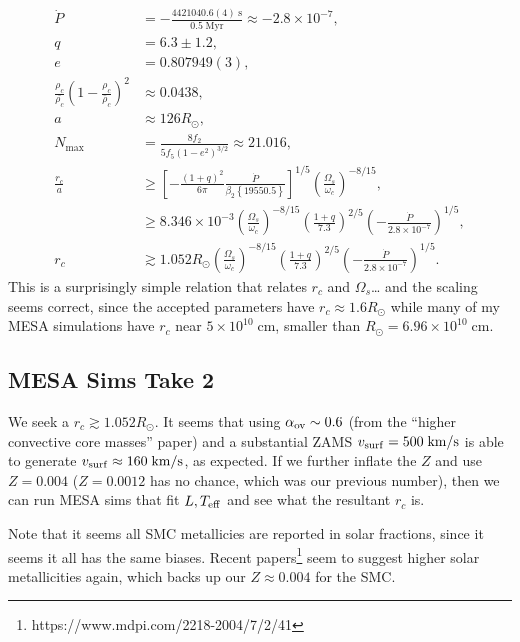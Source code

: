 \documentclass[11pt,
        usenames, %
        dvipsnames %
    ]{article}
\newcommand*{\scinot}[2]{#1\times10^{#2}}
\newcommand*{\p}[1]{\left(#1\right)}
\newcommand*{\s}[1]{\left[#1\right]}
\newcommand*{\z}[1]{\left\{#1\right\}}
\begin{document}
\begin{align}
    \dot{P} &= -\frac{4421040.6(4)\;\mathrm{s}}{0.5\;\mathrm{Myr}}
        \approx -\scinot{2.8}{-7},\\
    q &= 6.3 \pm 1.2,\\
    e &= 0.807949(3),\\
    \frac{\rho_c}{\bar{\rho_c}} \p{1 - \frac{\rho_c}{\bar{\rho}_c}}^2
            &\approx 0.0438,\\
    a &\approx 126R_{\odot},\\
    N_{\max} &= \frac{8f_2}{5f_5\p{1 - e^2}^{3/2}}
        \approx 21.016,\\
    \frac{r_c}{a} &\geq
            \s{-\frac{(1 + q)^2}{6\pi}
                \frac{\dot{P}}{\beta_2\z{19550.5}}}^{1/5}
                \p{\frac{\Omega_s}{\omega_c}}^{-8/15},\\
        &\geq \scinot{8.346}{-3}\p{\frac{\Omega_s}{\omega_c}}^{-8/15}
            \p{\frac{1 + q}{7.3}}^{2/5}
            \p{-\frac{\dot{P}}{\scinot{2.8}{-7}}}^{1/5},\\
    r_c &\gtrsim 1.052R_{\odot}\p{\frac{\Omega_s}{\omega_c}}^{-8/15}
        \p{\frac{1 + q}{7.3}}^{2/5}\p{-\frac{\dot{P}}{\scinot{2.8}{-7}}}^{1/5}.
\end{align}
This is a surprisingly simple relation that relates $r_c$ and $\Omega_s$\dots
and the scaling seems correct, since the accepted parameters have $r_c \approx
1.6R_{\odot}$ while many of my MESA simulations have $r_c$ near
$\scinot{5}{10}\;\mathrm{cm}$, smaller than $R_{\odot} =
\scinot{6.96}{10}\;\mathrm{cm}$.

\subsection{MESA Sims Take 2}

We seek a $r_c \gtrsim 1.052R_{\odot}$. It seems that using $\alpha_{\rm ov}
\sim 0.6$ (from the ``higher convective core masses'' paper) and a substantial
ZAMS $v_{\rm surf} = 500\;\mathrm{km/s}$ is able to generate $v_{\rm surf}
\approx 160\;\mathrm{km/s}$, as expected. If we further inflate the $Z$ and use
$Z = 0.004$ ($Z = 0.0012$ has no chance, which was our previous number), then we
can run MESA sims that fit $L, T_{\rm eff}$ and see what the resultant $r_c$ is.

Note that it seems all SMC metallicies are reported in solar fractions, since it
seems it all has the same biases. Recent papers\footnote{
https://www.mdpi.com/2218-2004/7/2/41} seem to suggest higher solar %
metallicities again, which backs up our $Z \approx 0.004$ for the SMC\@.
\end{document}
